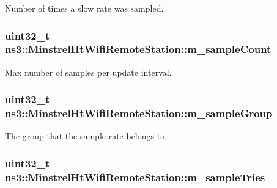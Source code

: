 Number of times a slow rate was sampled. 

\subsubsection[{\texorpdfstring{m\+\_\+sample\+Count}{m_sampleCount}}]{\setlength{\rightskip}{0pt plus 5cm}uint32\+\_\+t ns3\+::\+Minstrel\+Ht\+Wifi\+Remote\+Station\+::m\+\_\+sample\+Count}\hypertarget{structns3_1_1MinstrelHtWifiRemoteStation_a133597f95006c5cec893bc307db11034}{}\label{structns3_1_1MinstrelHtWifiRemoteStation_a133597f95006c5cec893bc307db11034}


Max number of samples per update interval. 

\subsubsection[{\texorpdfstring{m\+\_\+sample\+Group}{m_sampleGroup}}]{\setlength{\rightskip}{0pt plus 5cm}uint32\+\_\+t ns3\+::\+Minstrel\+Ht\+Wifi\+Remote\+Station\+::m\+\_\+sample\+Group}\hypertarget{structns3_1_1MinstrelHtWifiRemoteStation_a2c76c02fd0fa72e21d633bcfac23026f}{}\label{structns3_1_1MinstrelHtWifiRemoteStation_a2c76c02fd0fa72e21d633bcfac23026f}


The group that the sample rate belongs to. 

\subsubsection[{\texorpdfstring{m\+\_\+sample\+Tries}{m_sampleTries}}]{\setlength{\rightskip}{0pt plus 5cm}uint32\+\_\+t ns3\+::\+Minstrel\+Ht\+Wifi\+Remote\+Station\+::m\+\_\+sample\+Tries}\hypertarget{structns3_1_1MinstrelHtWifiRemoteStation_a2f7054322b509ec266a17902be8a9aaa}{}\label{structns3_1_1MinstrelHtWifiRemoteStation_a2f7054322b509ec266a17902be8a9aaa}


